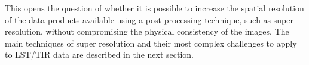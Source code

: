         This opens the question of whether it is possible to increase the spatial resolution of the data products available using a post-processing technique, such as super resolution, without compromising the physical consistency of the images.
        The main techniques of super resolution and their most complex challenges to apply to LST/TIR data are described in the next section.

\newpage